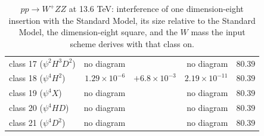 \begin{table}[t]
\begin{tabular}{@{}lrrrr@{}}
class 17 ($\psi^2 H^3 D^2$) & no diagram &  & no diagram & $80.39$\\
class 18 ($\psi^4 H^2$) & $1.29\times 10^{-6}$ & $+6.8\times 10^{-3}$ & $2.19\times 10^{-11}$ & $80.39$\\
class 19 ($\psi^4 X$) & no diagram &  & no diagram & $80.39$\\
class 20 ($\psi^4 H D$) & no diagram &  & no diagram & $80.39$\\
class 21 ($\psi^4 D^2$) & no diagram &  & no diagram & $80.39$\\
\hline\end{tabular}
\caption{$p p \to W^+ Z Z$ at 13.6 TeV: interference of one dimension-eight insertion with the Standard Model, its size relative to the Standard Model, the dimension-eight square, and the $W$ mass the input scheme derives with that class on.}\label{tab:triboson-wpzz}\end{table}
